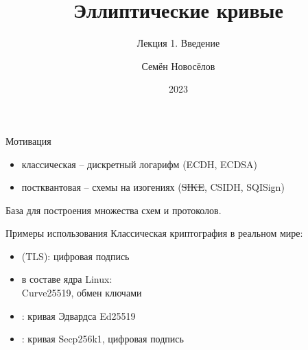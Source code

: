 \documentclass{beamer}
\title{Эллиптические кривые}
\subtitle{Лекция 1. Введение}
\author{Семён Новосёлов}
\institute{БФУ им. И. Канта}
\date{2023}
\begin{document}
    

\frame{\titlepage}

\begin{frame}{Мотивация}

    \begin{itemize}
        \item классическая -- дискретный логарифм (ECDH, ECDSA)
        \item постквантовая -- схемы на изогениях (\sout{SIKE}, CSIDH, SQISign)
    \end{itemize}
    
    База для построения множества схем и протоколов.
\end{frame}

\begin{frame}{Примеры использования}
Классическая криптография в реальном мире:
\vspace{0.5em}
\begin{itemize}
	\item {} (TLS): цифровая подпись
	\item {} в составе ядра Linux:
	\\Curve25519, обмен ключами
	\item {}: кривая Эдвардса Ed25519
	\item {}: кривая Secp256k1, цифровая подпись
\end{itemize}
\end{frame}
\end{document}
